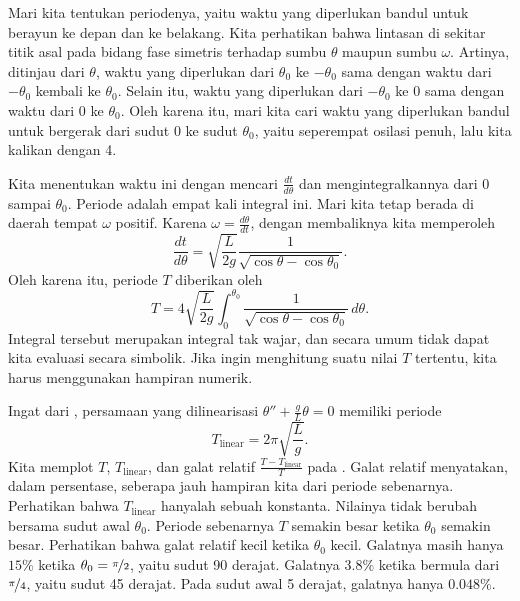 Mari kita tentukan periodenya, yaitu waktu yang diperlukan bandul untuk
berayun ke depan dan ke belakang.
Kita perhatikan bahwa lintasan di sekitar titik asal pada bidang fase
simetris terhadap sumbu $\theta$ maupun sumbu $\omega$. Artinya, ditinjau
dari $\theta$, waktu yang diperlukan dari $\theta_0$ ke $-\theta_0$ sama
dengan waktu dari $-\theta_0$ kembali ke $\theta_0$. Selain itu, waktu yang
diperlukan dari $-\theta_0$ ke $0$ sama dengan waktu dari $0$ ke
$\theta_0$. Oleh karena itu, mari kita cari waktu yang diperlukan bandul
untuk bergerak dari sudut 0 ke sudut $\theta_0$, yaitu seperempat osilasi
penuh, lalu kita kalikan dengan 4.

Kita menentukan waktu ini dengan mencari
$\frac{dt}{d\theta}$ dan mengintegralkannya dari $0$ sampai $\theta_0$.
Periode adalah empat kali integral ini. Mari kita tetap berada di daerah
tempat $\omega$ positif. Karena $\omega = \frac{d\theta}{dt}$, dengan
membaliknya kita memperoleh
\begin{equation*}
\frac{dt}{d\theta} = \sqrt{\frac{L}{2g}} \frac{1}{\sqrt{\cos \theta - \cos \theta_0 }} .
\end{equation*}
Oleh karena itu, periode $T$ diberikan oleh
\begin{equation*}
T = 4 \sqrt{\frac{L}{2g}} \int_0^{\theta_0} \frac{1}{\sqrt{\cos \theta -
\cos \theta_0 }}\, d\theta .
\end{equation*}
Integral tersebut merupakan integral tak wajar, dan secara umum tidak dapat
kita evaluasi secara simbolik. Jika ingin menghitung suatu nilai $T$
tertentu, kita harus menggunakan hampiran numerik.

Ingat dari , persamaan yang dilinearisasi
$\theta''+\frac{g}{L}\theta = 0$ memiliki periode
\begin{equation*}
T_{\text{linear}} = 2\pi \sqrt{\frac{L}{g}} .
\end{equation*}
Kita memplot $T$, $T_{\text{linear}}$, dan galat relatif
$\frac{T-T_{\text{linear}}}{T}$ pada . Galat relatif
menyatakan, dalam persentase, seberapa jauh hampiran kita dari periode
sebenarnya. Perhatikan bahwa $T_{\text{linear}}$ hanyalah sebuah konstanta.
Nilainya tidak berubah bersama sudut awal $\theta_0$. Periode sebenarnya $T$
semakin besar ketika $\theta_0$ semakin besar.
Perhatikan bahwa galat relatif kecil ketika $\theta_0$ kecil. Galatnya masih
hanya $15\%$ ketika $\theta_0 = \nicefrac{\pi}{2}$, yaitu sudut 90 derajat.
Galatnya $3.8\%$ ketika bermula dari $\nicefrac{\pi}{4}$, yaitu sudut
45 derajat. Pada sudut awal 5 derajat, galatnya hanya $0.048 \%$.

